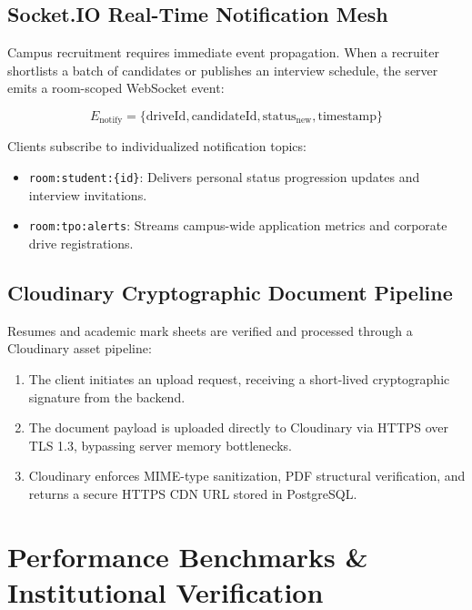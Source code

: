 \documentclass[12pt,a4paper]{report}
\begin{document}
\section{Socket.IO Real-Time Notification Mesh}
Campus recruitment requires immediate event propagation. When a recruiter shortlists a batch of candidates or publishes an interview schedule, the server emits a room-scoped WebSocket event:

\begin{equation}
E_{\text{notify}} = \{ \text{driveId}, \text{candidateId}, \text{status}_{\text{new}}, \text{timestamp} \}
\end{equation}

Clients subscribe to individualized notification topics:
\begin{itemize}
    \item \texttt{room:student:\{id\}}: Delivers personal status progression updates and interview invitations.
    \item \texttt{room:tpo:alerts}: Streams campus-wide application metrics and corporate drive registrations.
\end{itemize}

\section{Cloudinary Cryptographic Document Pipeline}
Resumes and academic mark sheets are verified and processed through a Cloudinary asset pipeline:
\begin{enumerate}
    \item The client initiates an upload request, receiving a short-lived cryptographic signature from the backend.
    \item The document payload is uploaded directly to Cloudinary via HTTPS over TLS 1.3, bypassing server memory bottlenecks.
    \item Cloudinary enforces MIME-type sanitization, PDF structural verification, and returns a secure HTTPS CDN URL stored in PostgreSQL.
\end{enumerate}

\chapter{Performance Benchmarks \& Institutional Verification}
\end{document}
